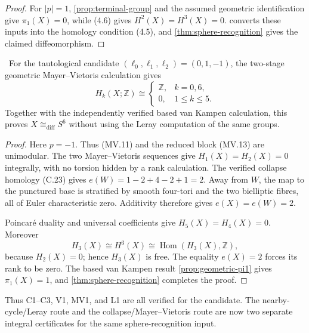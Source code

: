 \begin{proof}
For $|p|=1$, 
\cref{prop:terminal-group} and the assumed geometric identification give
$\pi_1(X)=0$, while (4.6) gives $H^2(X)=H^3(X)=0$.
 converts these inputs into the homology
condition (4.5), and
\cref{thm:sphere-recognition} gives the claimed diffeomorphism.
\end{proof}

\begin{corollary}
\label{cor:candidate-mv-sphere}
\Verified\ For the tautological candidate
$(\ell_0,\ell_1,\ell_2)=(0,1,-1)$, the two-stage geometric
Mayer--Vietoris calculation gives
\[
 H_k(X;\mathbb Z)\cong
 \begin{cases}
 \mathbb Z,&k=0,6,\\
 0,&1\leq k\leq5.
 \end{cases}
\]
Together with the independently verified based van Kampen calculation, this
proves $X\cong_{\mathrm{diff}}S^6$ without using the Leray computation of the
same groups.
\end{corollary}

\begin{proof}
Here $p=-1$.  Thus (MV.11) and the reduced block (MV.13) are unimodular.
The two Mayer--Vietoris sequences give $H_1(X)=H_2(X)=0$ integrally, with no
torsion hidden by a rank calculation.  The verified collapse homology
(C.23) gives $e(W)=1-2+4-2+1=2$.  Away from $W$, the map to the punctured
base is stratified by smooth four-tori and the two bielliptic fibres, all of
Euler characteristic zero.  Additivity therefore gives $e(X)=e(W)=2$.

Poincar\'e duality and universal coefficients give $H_5(X)=H_4(X)=0$.
Moreover
\[
 H_3(X)\cong H^3(X)\cong\operatorname{Hom}(H_3(X),\mathbb Z),
\]
because $H_2(X)=0$; hence $H_3(X)$ is free.  The equality $e(X)=2$ forces
its rank to be zero.  The based van Kampen result
\cref{prop:geometric-pi1} gives $\pi_1(X)=1$, and
\cref{thm:sphere-recognition} completes the proof.
\end{proof}

Thus C1--C3, V1, MV1, and L1 are all verified for the candidate.  The
nearby-cycle/Leray route and the collapse/Mayer--Vietoris route are now two
separate integral certificates for the same sphere-recognition input.
